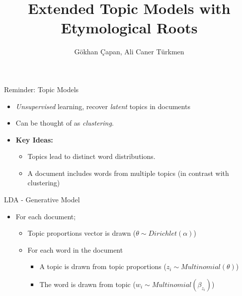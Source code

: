 \documentclass[pdf]{beamer}
\title{Extended Topic Models with Etymological Roots}
\author{G\" okhan \c Capan, Ali Caner T\" urkmen}
\begin{document}
	
\begin{frame}
	\titlepage
\end{frame}

\begin{frame}{Reminder: Topic Models}
	
	\begin{itemize}
		\item {\em Unsupervised} learning, recover \emph{latent} topics in documents
		\item Can be thought of as {\em clustering}.
		\item {\bf Key Ideas:} 
			\begin{itemize}
			\item Topics lead to distinct word distributions. 
			\item  A document includes words from multiple topics (in contrast with clustering)
			\end{itemize}
	\end{itemize}
\end{frame}


\begin{frame}{LDA - Generative Model}	
	\begin{itemize}
		\item For each document;
		\begin{itemize}
			\item Topic proportions vector is drawn ($\theta \sim Dirichlet(\alpha)$)
			\item For each word in the document
			\begin{itemize}
				\item A topic is drawn from topic proportions ($z_i \sim Multinomial(\theta)$)
				\item The word is drawn from topic ($w_i \sim Multinomial(\beta_{z_i})$)
			\end{itemize}
		\end{itemize}
	\end{itemize}
\end{frame}
\end{document}
